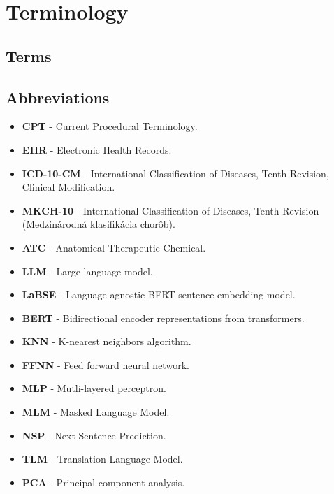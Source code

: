 
\chapter*{Terminology}

\section*{Terms}

    \setlength\itemsep{1px}

\section*{Abbreviations}

\begin{itemize}
    \setlength\itemsep{1px}
    \item \textbf{CPT} - Current Procedural Terminology.
    \item \textbf{EHR} - Electronic Health Records.
    \item \textbf{ICD-10-CM} - International Classification of Diseases, Tenth Revision, Clinical Modification.
    \item \textbf{MKCH-10} - International Classification of Diseases, Tenth Revision (Medzinárodná klasifikácia chorôb).
    \item \textbf{ATC} - Anatomical Therapeutic Chemical.
    \item \textbf{LLM} - Large language model. 
    \item \textbf{LaBSE} - Language-agnostic BERT sentence embedding model.
    \item \textbf{BERT} - Bidirectional encoder representations from transformers.
    \item \textbf{KNN} - K-nearest neighbors algorithm.
    \item \textbf{FFNN} - Feed forward neural network.
    \item \textbf{MLP} - Mutli-layered perceptron.
    \item \textbf{MLM} - Masked Language Model.
    \item \textbf{NSP} - Next Sentence Prediction. 
    \item \textbf{TLM} - Translation Language Model.
    \item \textbf{PCA} - Principal component analysis.
\end{itemize}



